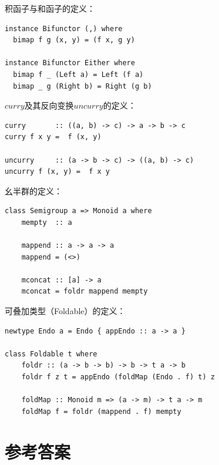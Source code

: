 \documentclass[b5paper]{ctexart}
\begin{document}
积函子与和函子的定义：

\begin{lstlisting}
instance Bifunctor (,) where
  bimap f g (x, y) = (f x, g y)

instance Bifunctor Either where
  bimap f _ (Left a) = Left (f a)
  bimap _ g (Right b) = Right (g b)
\end{lstlisting}

$curry$及其反向变换$uncurry$的定义：

\begin{lstlisting}
curry       :: ((a, b) -> c) -> a -> b -> c
curry f x y =  f (x, y)

uncurry     :: (a -> b -> c) -> ((a, b) -> c)
uncurry f (x, y) =  f x y
\end{lstlisting}

幺半群的定义：

\begin{lstlisting}
class Semigroup a => Monoid a where
    mempty  :: a

    mappend :: a -> a -> a
    mappend = (<>)

    mconcat :: [a] -> a
    mconcat = foldr mappend mempty
\end{lstlisting}

可叠加类型（Foldable）的定义：

\begin{lstlisting}
newtype Endo a = Endo { appEndo :: a -> a }

class Foldable t where
    foldr :: (a -> b -> b) -> b -> t a -> b
    foldr f z t = appEndo (foldMap (Endo . f) t) z

    foldMap :: Monoid m => (a -> m) -> t a -> m
    foldMap f = foldr (mappend . f) mempty
\end{lstlisting}

\ifx\wholebook\relax \else
\section{参考答案}
\shipoutAnswer
\end{document}
